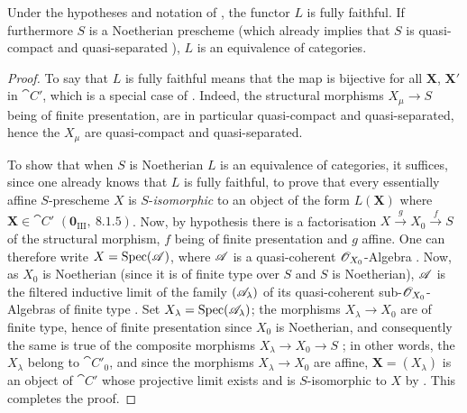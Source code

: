\begin{proposition}[8.13.5]
\label{IV.8.13.5}
Under the hypotheses and notation of , the functor $L$ is fully faithful.
If furthermore $S$ is a Noetherian prescheme \textup{(which already implies that $S$ is quasi-compact and quasi-separated )}, $L$ is an equivalence of categories.
\end{proposition}

\begin{proof}
To say that $L$ is fully faithful means that the map  is bijective for all $\mathbf{X}$, $\mathbf{X}'$ in $\cat{C}'$, which is a special case of .
Indeed, the structural morphisms $X_\mu\to S$ being of finite presentation, are in particular quasi-compact and quasi-separated, hence the $X_\mu$ are quasi-compact and quasi-separated.

To show that when $S$ is Noetherian $L$ is an equivalence of categories, it suffices, since one already knows that $L$ is fully faithful, to prove that every essentially affine $S$-prescheme $X$ is $S$-\emph{isomorphic} to an object of the form $L(\mathbf{X})$ where $\mathbf{X}\in\cat{C}'$ $(\mathbf{0}_{\text{III}},~8.1.5)$.
Now, by hypothesis there is a factorisation $X\xrightarrow{g}X_0\xrightarrow{f}S$ of the structural morphism, $f$ being of finite presentation and $g$ affine.
One can therefore write $X=\operatorname{Spec}(\mathscr{A})$, where $\mathscr{A}$ is a quasi-coherent $\mathscr{O}_{X_0}$-Algebra .
Now, as $X_0$ is Noetherian (since it is of finite type over $S$ and $S$ is Noetherian), $\mathscr{A}$ is the filtered inductive limit of the family $(\mathscr{A}_\lambda)$ of its quasi-coherent sub-$\mathscr{O}_{X_0}$-Algebras of finite type .
Set $X_\lambda=\operatorname{Spec}(\mathscr{A}_\lambda)$; the morphisms $X_\lambda\to X_0$ are of finite type, hence of finite presentation since $X_0$ is Noetherian, and consequently the same is true of the composite morphisms $X_\lambda\to X_0\to S$ ; in other words, the $X_\lambda$ belong to $\cat{C}'_0$, and since the morphisms $X_\lambda\to X_0$ are affine, $\mathbf{X}=(X_\lambda)$ is an object of $\cat{C}'$ whose projective limit exists and is $S$-isomorphic to $X$ by .
This completes the proof.
\end{proof}

